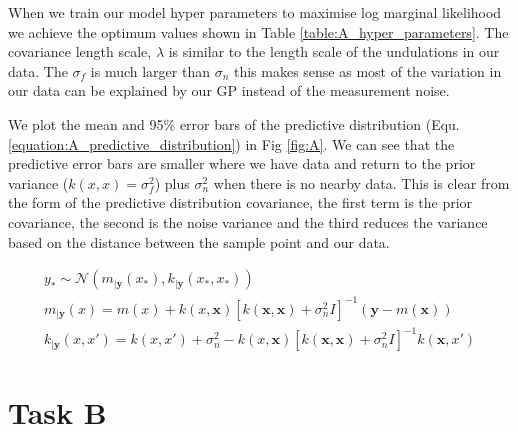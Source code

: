 \documentclass[11pt]{article}
\begin{document}
When we train our model hyper parameters to maximise log marginal likelihood we achieve the optimum values shown in Table \ref{table:A_hyper_parameters}. The covariance length scale, $\lambda$ is similar to the length scale of the undulations in our data. The $\sigma_f$ is much larger than $\sigma_n$ this makes sense as most of the variation in our data can be explained by our GP instead of the measurement noise.

We plot the mean and 95\% error bars of the predictive distribution (Equ.\ref{equation:A_predictive_distribution}) in Fig \ref{fig:A}. We can see that the predictive error bars are smaller where we have data and return to the prior variance ($k(x, x) = \sigma_f^2$) plus $\sigma_n^2$ when there is no nearby data. This is clear from the form of the predictive distribution covariance, the first term is the prior covariance, the second is the noise variance and the third reduces the variance based on the distance between the sample point and our data.

\begin{equation}
    \begin{gathered}
        y_* \sim \mathcal{N}(m_{|\textbf{y}}(x_*), k_{|\textbf{y}}(x_*, x_*)) \\
        m_{|\textbf{y}}(x) = m(x) + k(x, \textbf{x})[k(\textbf{x}, \textbf{x}) + \sigma_n^2 I]^{-1} (\textbf{y} - m(\textbf{x})) \\
        k_{|\textbf{y}}(x, x') = k(x, x') + \sigma_n^2 - k(x, \textbf{x})[k(\textbf{x}, \textbf{x}) + \sigma_n^2 I]^{-1} k(\textbf{x}, x')
    \end{gathered}
    \label{equation:A_predictive_distribution}
\end{equation}

\section{Task B}
\end{document}
